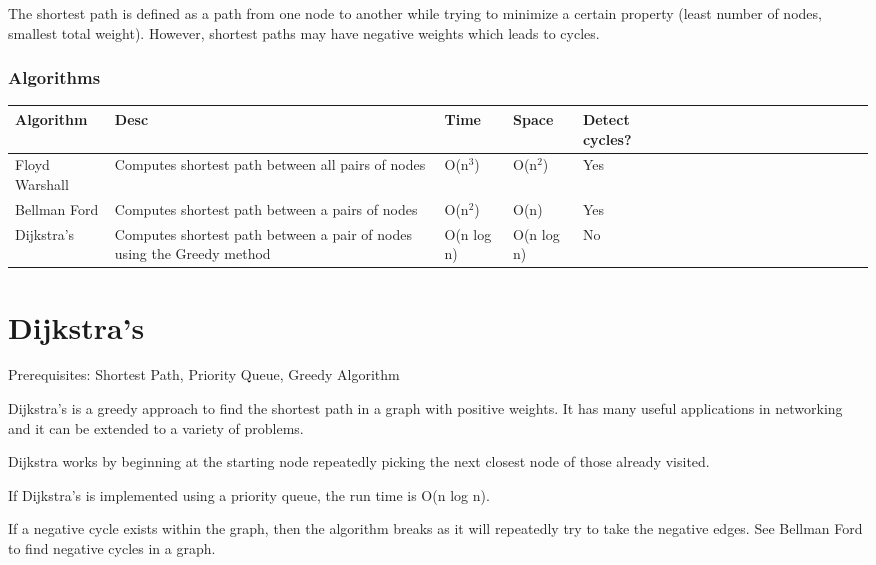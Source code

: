 \documentclass[11pt,oneside]{book}
\begin{document}
The shortest path is defined as a path from one node to another while trying to minimize a certain property (least number of nodes, smallest total weight). However, shortest paths may have negative weights which leads to cycles.

\subsubsection{Algorithms}

\vspace{10pt} \begin{tabulary}{0.4\linewidth}{|l|l|l|l|l|l|l|l|l|l|l|l|l|l|l|l|l|l|l}\hline


  Algorithm &
  Desc &
  Time &
  Space &
  Detect cycles?\\
\hline


  Floyd Warshall &
  Computes shortest path between all pairs of nodes &
  O(n$^{3}$) &
  O(n$^{2}$) &
  Yes\\

  Bellman Ford &
  Computes shortest path between a pairs of nodes &
  O(n$^{2}$) &
  O(n) &
  Yes\\

  Dijkstra's &
  Computes shortest path between a pair of nodes using the Greedy method &
  O(n log n) &
  O(n log n) &
  No\\

\hline\end{tabulary}


        \section{ Dijkstra's }
        

Prerequisites:  Shortest Path, Priority Queue, Greedy Algorithm

Dijkstra's is a greedy approach to find the shortest path in a graph with positive weights. It has many useful applications in networking and it can be extended to a variety of problems.

Dijkstra works by beginning at the starting node repeatedly picking the next closest node of those already visited.

If Dijkstra's is implemented using a priority queue, the run time is O(n log n).

If a negative cycle exists within the graph, then the algorithm breaks as it will repeatedly try to take the negative edges. See Bellman Ford to find negative cycles in a graph.
\end{document}
